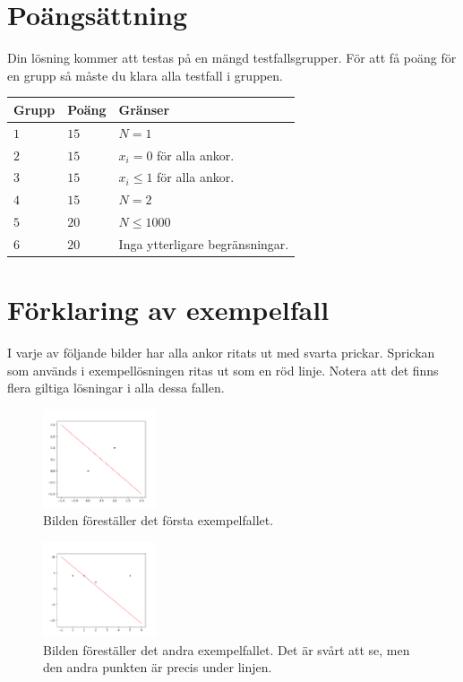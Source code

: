 \section*{Poängsättning}
Din lösning kommer att testas på en mängd testfallsgrupper.
För att få poäng för en grupp så måste du klara alla testfall i gruppen.

\noindent
\begin{tabular}{| l | l | p{12cm} |}
  \hline
  \textbf{Grupp} & \textbf{Poäng} & \textbf{Gränser} \\ \hline
  $1$    & $15$       & $N = 1$ \\ \hline
  $2$    & $15$       & $x_i = 0$ för alla ankor. \\ \hline
  $3$    & $15$       & $x_i \leq 1$ för alla ankor. \\ \hline
  $4$    & $15$       & $N = 2$ \\ \hline
  $5$    & $20$       & $N \leq 1000$ \\ \hline
  $6$    & $20$       & Inga ytterligare begränsningar. \\ \hline
\end{tabular}

\section*{Förklaring av exempelfall}
I varje av följande bilder har alla ankor ritats ut med svarta prickar. Sprickan som används i exempellösningen ritas ut som en röd linje.
Notera att det finns flera giltiga lösningar i alla dessa fallen.

\begin{centering}
  \begin{figure}[h]
      \centering
      \includegraphics[width=0.3\textwidth]{sample1.png}
      \caption{Bilden föreställer det första exempelfallet.}
      \label{fig:enter-label}
  \end{figure}
\end{centering}

\begin{centering}
  \begin{figure}[h]
      \centering
      \includegraphics[width=0.3\textwidth]{sample2.png}
      \caption{Bilden föreställer det andra exempelfallet. Det är svårt att se, men den andra punkten
      är precis under linjen.}
      \label{fig:enter-label}
  \end{figure}
\end{centering}

